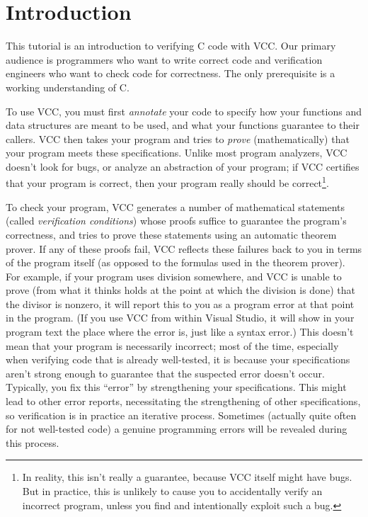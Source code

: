 \section{Introduction}
This tutorial is an introduction to verifying C code with VCC. Our
primary audience is programmers who want to write correct code and
verification engineers who want to check code for correctness. The
only prerequisite is a working understanding of C. 

To use VCC, you must first \emph{annotate} your code to specify how
your functions and data structures are meant to be used, and what your
functions guarantee to their callers.
VCC then
takes your program and tries to \emph{prove} (mathematically) that
your program meets these specifications.  Unlike most program
analyzers, VCC doesn't look for bugs, or analyze an abstraction of
your program; if VCC certifies that your program is correct, then your
program really should be correct\footnote{In reality, this isn't
  really a guarantee, because VCC itself might have bugs. But in
  practice, this is unlikely to cause you to accidentally verify an
  incorrect program, unless you find and intentionally exploit such a
  bug. 
  }. 

To check your program, VCC generates a number of mathematical
statements (called \emph{verification conditions}) whose proofs
suffice to guarantee the program's correctness, and tries to prove
these statements using an automatic theorem prover. If any of these
proofs fail, VCC reflects these failures back to you in terms of the
program itself (as opposed to the formulas used in the theorem prover).
For example, if your program uses division
somewhere, and VCC is unable to prove (from what it thinks holds at the
point at which the division is done) that the divisor is nonzero, it
will report this to you as a program error at that point in the
program. (If you use VCC from within Visual Studio, it will show in
your program text the place where the error is, just like a syntax
error.) This doesn't mean that your program is necessarily incorrect;
most of the time, especially when verifying code that is already well-tested,
it is because your specifications aren't strong
enough to guarantee that the suspected error doesn't occur.
Typically, you fix this ``error'' by strengthening your
specifications. This might lead to other error reports, necessitating
the strengthening of other specifications, so verification is in
practice an iterative process.  
Sometimes (actually quite often for not well-tested code)
a genuine programming errors will be revealed during this process.

